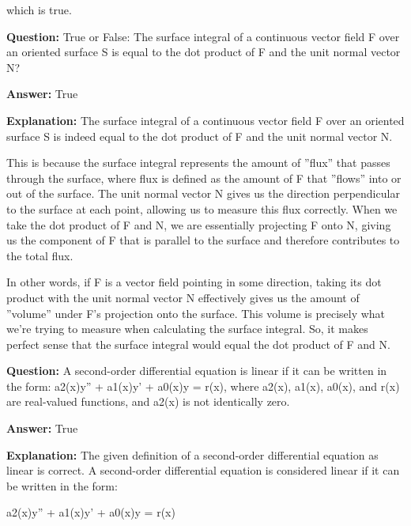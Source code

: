 \documentclass{article}
\begin{document}
which is true.
                
                \vspace{0.5cm} 
        
            
                \textbf {Question:} True or False: The surface integral of a continuous vector field F over an oriented surface S is equal to the dot product of F and the unit normal vector N?
                
                \textbf{Answer:} True

                \textbf{Explanation:} The surface integral of a continuous vector field F over an oriented surface S is indeed equal to the dot product of F and the unit normal vector N.

This is because the surface integral represents the amount of ''flux'' that passes through the surface, where flux is defined as the amount of F that ''flows'' into or out of the surface. The unit normal vector N gives us the direction perpendicular to the surface at each point, allowing us to measure this flux correctly. When we take the dot product of F and N, we are essentially projecting F onto N, giving us the component of F that is parallel to the surface and therefore contributes to the total flux.

In other words, if F is a vector field pointing in some direction, taking its dot product with the unit normal vector N effectively gives us the amount of ''volume'' under F's projection onto the surface. This volume is precisely what we're trying to measure when calculating the surface integral. So, it makes perfect sense that the surface integral would equal the dot product of F and N.
                
                \vspace{0.5cm} 
        
            
                \textbf {Question:} A second-order differential equation is linear if it can be written in the form: a2(x)y'' + a1(x)y' + a0(x)y = r(x), where a2(x), a1(x), a0(x), and r(x) are real-valued functions, and a2(x) is not identically zero.
                
                \textbf{Answer:} True

                \textbf{Explanation:} The given definition of a second-order differential equation as linear is correct. A second-order differential equation is considered linear if it can be written in the form:

a2(x)y'' + a1(x)y' + a0(x)y = r(x)
\end{document}
